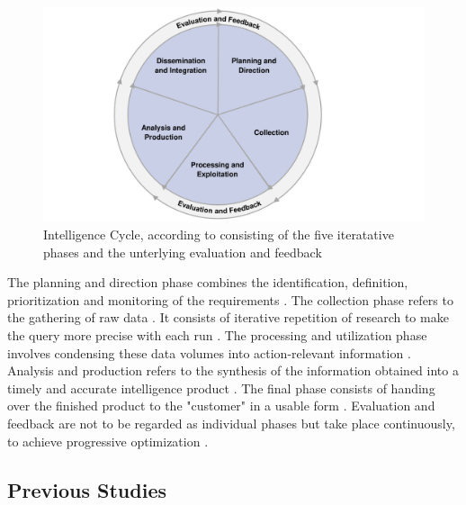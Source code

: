 \documentclass[10pt]{article}
\begin{document}
\begin{figure}[h]
    \centering
    \includegraphics[clip,width=0.8\linewidth]{PDF/images/crop_Intelligence Cycle}
    \caption{Intelligence Cycle, according to \cite{JointChiefsofStaffU.S.Army.2013} consisting of the five iteratative phases and the unterlying evaluation and feedback}
    \label{fig: intelligence cycle}
\end{figure}

The planning and direction phase combines the identification, definition, prioritization and monitoring
of the requirements \cite{JointChiefsofStaffU.S.Army.2013}.
The collection phase refers to the gathering of raw data \cite{CentralIntelligenceAgency.1987}.
It consists of iterative repetition of research
\cite{NorthAtlanticTreatyOrganization.2001} to make the query more precise with each run
\cite{PastorGalindo.2020}. The processing and utilization phase involves condensing
these data volumes into action-relevant information
\cite{JointChiefsofStaffU.S.Army.2013}.
Analysis and production refers to the synthesis of the information obtained into a timely and accurate intelligence product
\cite{Hwang.2022, NorthAtlanticTreatyOrganization.2001}.
The final phase consists of handing over the finished product to the "customer" in a
usable form \cite{CentralIntelligenceAgency.2023, Williams.2018}.
Evaluation and feedback are not to be regarded as individual phases
but take place continuously, to achieve progressive optimization
\cite{JointChiefsofStaffU.S.Army.2013, NorthAtlanticTreatyOrganization.2001}.

\subsection{Previous Studies}
\end{document}
